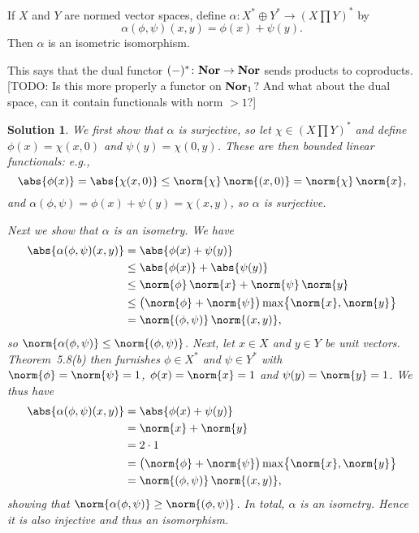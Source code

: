 \documentclass[article, a4paper, 11pt, oneside]{memoir}
\numberwithin{equation}{chapter}
\theoremstyle{nonumberplain}
\newtheorem{solution}{Solution}
\begin{document}
\begin{exerciseframed*}[21]
	If $X$ and $Y$ are normed vector spaces, define $\alpha \colon X^* \oplus Y^* \to (X \prod Y)^*$ by
	\begin{equation*}
		\alpha(\phi,\psi)(x,y) = \phi(x) + \psi(y).
	\end{equation*}
	Then $\alpha$ is an isometric isomorphism.
\end{exerciseframed*}
%
This says that the dual functor $(-)^* \colon \mathbf{Nor} \to \mathbf{Nor}$ sends products to coproducts. [TODO: Is this more properly a functor on $\mathbf{Nor}_1$? And what about the dual space, can it contain functionals with norm $>1$?]

\begin{solution}
	We first show that $\alpha$ is surjective, so let $\chi \in (X \prod Y)^*$ and define $\phi(x) = \chi(x,0)$ and $\psi(y) = \chi(0,y)$. These are then bounded linear functionals: e.g.,
	\begin{equation*}
		\abs{ \phi(x) }
			= \abs{ \chi(x,0) }
			\leq \norm{\chi} \, \norm{(x,0)}
			= \norm{\chi} \, \norm{x},
	\end{equation*}
	and $\alpha(\phi,\psi) = \phi(x) + \psi(y) = \chi(x,y)$, so $\alpha$ is surjective.

	Next we show that $\alpha$ is an isometry. We have
	\begin{align*}
		\abs{ \alpha(\phi,\psi)(x,y) }
			&= \abs{ \phi(x) + \psi(y) } \\
			&\leq \abs{\phi(x)} + \abs{\psi(y)} \\
			&\leq \norm{\phi} \, \norm{x} + \norm{\psi} \, \norm{y} \\
			&\leq \bigl( \norm{\phi} + \norm{\psi} \bigr) \max \bigl\{ \norm{x}, \norm{y} \bigr\} \\
			&= \norm{(\phi,\psi)} \, \norm{(x,y)},
	\end{align*}
	so $\norm{\alpha(\phi,\psi)} \leq \norm{(\phi,\psi)}$. Next, let $x \in X$ and $y \in Y$ be unit vectors. Theorem~5.8(b) then furnishes $\phi \in X^*$ and $\psi \in Y^*$ with $\norm{\phi} = \norm{\psi} = 1$, $\phi(x) = \norm{x} = 1$ and $\psi(y) = \norm{y} = 1$. We thus have
	\begin{align*}
		\abs{ \alpha(\phi,\psi)(x,y) }
			&= \abs{ \phi(x) + \psi(y) } \\
			&= \norm{x} + \norm{y} \\
			&= 2 \cdot 1 \\
			&= \bigl( \norm{\phi} + \norm{\psi} \bigr) \max \bigl\{ \norm{x}, \norm{y} \bigr\} \\
			&= \norm{(\phi,\psi)} \, \norm{(x,y)},
	\end{align*}
	showing that $\norm{\alpha(\phi,\psi)} \geq \norm{(\phi,\psi)}$. In total, $\alpha$ is an isometry. Hence it is also injective and thus an isomorphism.
\end{solution}
\end{document}
